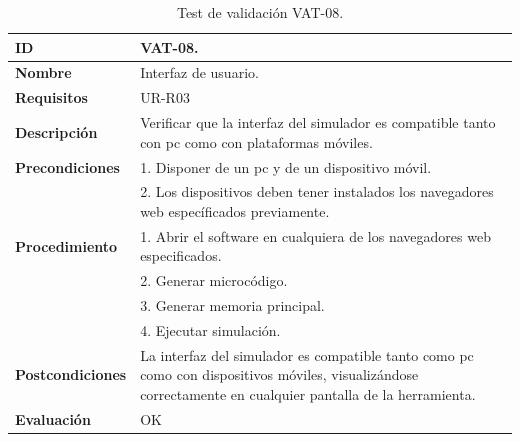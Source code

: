 \begin{center}
\begin{table}[htb]
\centering
\caption{Test de validación VAT-08.}
\begin{tabular}{@{}p{2.5cm} p{9cm}@{}} 
\toprule
\textbf{ID} 					& VAT-08. \\
\midrule
\textbf{Nombre} 				& Interfaz de usuario. \\
\midrule
\textbf{Requisitos} 		& UR-R03\\
\midrule
\textbf{Descripción} 		& Verificar que la interfaz del simulador es compatible tanto con pc como con plataformas móviles. \\
\midrule
\textbf{Precondiciones}		& 1. Disponer de un pc y de un dispositivo móvil. \\
											& 2. Los dispositivos deben tener instalados los navegadores web específicados previamente. \\
\midrule
\textbf{Procedimiento}			& 1. Abrir el software en cualquiera de los navegadores web especificados. \\
							& 2. Generar microcódigo.\\
							& 3. Generar memoria principal.\\
							& 4. Ejecutar simulación.\\
\midrule
\textbf{Postcondiciones} 		&  La interfaz del simulador es compatible tanto como pc como con dispositivos móviles, visualizándose correctamente en cualquier pantalla de la herramienta.\\
\midrule
\textbf{Evaluación} 			& OK \\
\bottomrule
\end{tabular}
\label{tab:vat-08}
\end{table}
\end{center}

